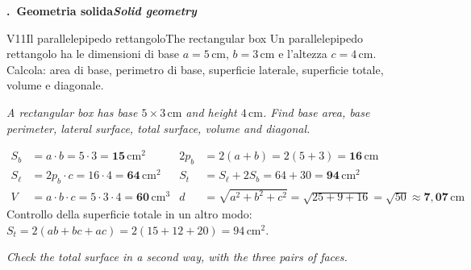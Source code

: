 \documentclass[11pt,a4paper]{article}
\newcommand{\en}[1]{\par{\small\itshape\color{engray}#1\par}}
\newcommand{\unit}[1]{\,\mathrm{#1}}
\newcommand{\cm}{\unit{cm}}
\newcommand{\cmq}{\unit{cm^2}}
\newcommand{\cmc}{\unit{cm^3}}
\newcounter{sezione}
\newcommand{\sezione}[2]{%
  \par\addvspace{14pt}\Needspace{10\baselineskip}%
  \refstepcounter{sezione}%
  \noindent\begin{tcolorbox}[enhanced, colback=navy, colframe=navy, sharp corners,
      left=6pt, right=6pt, top=3pt, bottom=3pt, boxsep=0pt, before skip=0pt, after skip=6pt]
    {\color{white}\large\bfseries \thesezione.\ #1\hfill{\normalsize\itshape #2}}
  \end{tcolorbox}\par}
\begin{document}

\newcommand{\scatola}[3]{%
  \coordinate (A) at (0,0); \coordinate (B) at (#1,0); \coordinate (C) at (#1,#3); \coordinate (D) at (0,#3);
  \coordinate (dv) at (40:{0.55*#2});
  \coordinate (A') at ($(A)+(dv)$); \coordinate (B') at ($(B)+(dv)$);
  \coordinate (C') at ($(C)+(dv)$); \coordinate (D') at ($(D)+(dv)$);
  \draw[hidden] (A) -- (A') -- (B') (A') -- (D');
  \draw[side] (A) -- (B) -- (C) -- (D) -- cycle;
  \draw[side] (D) -- (D') -- (C') -- (C);
  \draw[side] (B) -- (B') -- (C');}

\sezione{Geometria solida}{Solid geometry}

\begin{esercizio}{V1}{1}{Il parallelepipedo rettangolo}{The rectangular box}
Un parallelepipedo rettangolo ha le dimensioni di base $a=5\cm$, $b=3\cm$ e l'altezza $c=4\cm$. Calcola: area di base, perimetro di base, superficie laterale, superficie totale, volume e diagonale.
\en{A rectangular box has base $5 \times 3\cm$ and height $4\cm$. Find base area, base perimeter, lateral surface, total surface, volume and diagonal.}
\begin{center}
\end{center}
\end{esercizio}
\begin{solbox}
\begin{align*}
S_b&=a\cdot b=5\cdot3=\mathbf{15\cmq} & 2p_b&=2(a+b)=2(5+3)=\mathbf{16\cm}\\
S_\ell&=2p_b\cdot c=16\cdot4=\mathbf{64\cmq} & S_t&=S_\ell+2S_b=64+30=\mathbf{94\cmq}\\
V&=a\cdot b\cdot c=5\cdot3\cdot4=\mathbf{60\cmc} & d&=\sqrt{a^2+b^2+c^2}=\sqrt{25+9+16}=\sqrt{50}\approx\mathbf{7,07\cm}
\end{align*}
Controllo della superficie totale in un altro modo: $S_t=2(ab+bc+ac)=2(15+12+20)=94\cmq$. \checkmark
\en{Check the total surface in a second way, with the three pairs of faces.}
\end{solbox}
\end{document}
